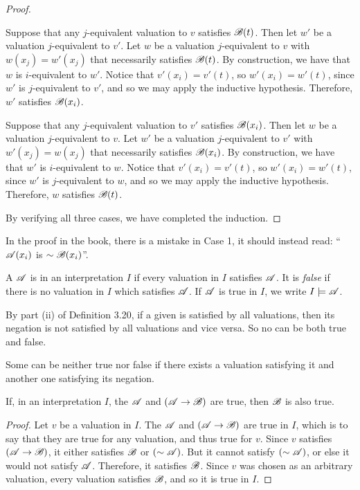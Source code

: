\begin{proposition}
\begin{proof}
\begin{enumerate}
          \Ra{} Suppose that any \(j\)-equivalent valuation to \(v\) satisfies \(\mathscr{B}(t)\). Then let \(w'\) be a valuation \(j\)-equivalent to \(v'\). Let \(w\) be a valuation \(j\)-equivalent to \(v\) with \(w(x_j) = w'(x_j)\) that necessarily satisfies \(\mathscr{B}(t)\). By construction, we have that \(w\) is \(i\)-equivalent to \(w'\). Notice that \(v'(x_i) = v'(t)\), so \(w'(x_i) = w'(t)\), since \(w'\) is \(j\)-equivalent to \(v'\), and so we may apply the inductive hypothesis. Therefore, \(w'\) satisfies \(\mathscr{B}(x_i)\).

          \La{} Suppose that any \(j\)-equivalent valuation to \(v'\) satisfies \(\mathscr{B}(x_i)\). Then let \(w\) be a valuation \(j\)-equivalent to \(v\). Let \(w'\) be a valuation \(j\)-equivalent to \(v'\) with \(w'(x_j) = w(x_j)\) that necessarily satisfies \(\mathscr{B}(x_i)\). By construction, we have that \(w'\) is \(i\)-equivalent to \(w\). Notice that \(v'(x_i) = v'(t)\), so \(w'(x_i) = w'(t)\), since \(w'\) is \(j\)-equivalent to \(w\), and so we may apply the inductive hypothesis. Therefore, \(w\) satisfies \(\mathscr{B}(t)\).
      \end{enumerate}
    By verifying all three cases, we have completed the induction.
  \end{proof}

  \note{} In the proof in the book, there is a mistake in Case 1, it should instead read: ``\(\mathscr{A}(x_i)\) is \(\sim\mathscr{B}(x_i)\)''.
\end{proposition}

\begin{definition}
  A \wf{} \(\mathscr{A}\) is  in an interpretation \(I\) if every valuation in \(I\) satisfies \(\mathscr{A}\). It is \textit{false} if there is no valuation in \(I\) which satisfies \(\mathscr{A}\). If \(\mathscr{A}\) is true in \(I\), we write \(I \models \mathscr{A}\).

  \note{} By part (ii) of Definition 3.20, if a given \wf{} is satisfied by all valuations, then its negation is not satisfied by all valuations and vice versa. So no \wf{} can be both true and false.

  \note{} Some \wfs{} can be neither true nor false if there exists a valuation satisfying it and another one satisfying its negation.
\end{definition}

\setcounter{definition}{25}
\begin{proposition}
  If, in an interpretation \(I\), the \wf{} \(\mathscr{A}\) and \((\mathscr{A} \rightarrow \mathscr{B})\) are true, then \(\mathscr{B}\) is also true.

  \begin{proof}
    Let \(v\) be a valuation in \(I\). The \wfs{} \(\mathscr{A}\) and \((\mathscr{A} \rightarrow \mathscr{B})\) are true in \(I\), which is to say that they are true for any valuation, and thus true for \(v\). Since \(v\) satisfies \((\mathscr{A} \rightarrow \mathscr{B})\), it either satisfies \(\mathscr{B}\) or \((\sim\mathscr{A})\). But it cannot satisfy \((\sim\mathscr{A})\), or else it would not satisfy \(\mathscr{A}\). Therefore, it satisfies \(\mathscr{B}\). Since \(v\) was chosen as an arbitrary valuation, every valuation satisfies \(\mathscr{B}\), and so it is true in \(I\).
  \end{proof}
\end{proposition}

